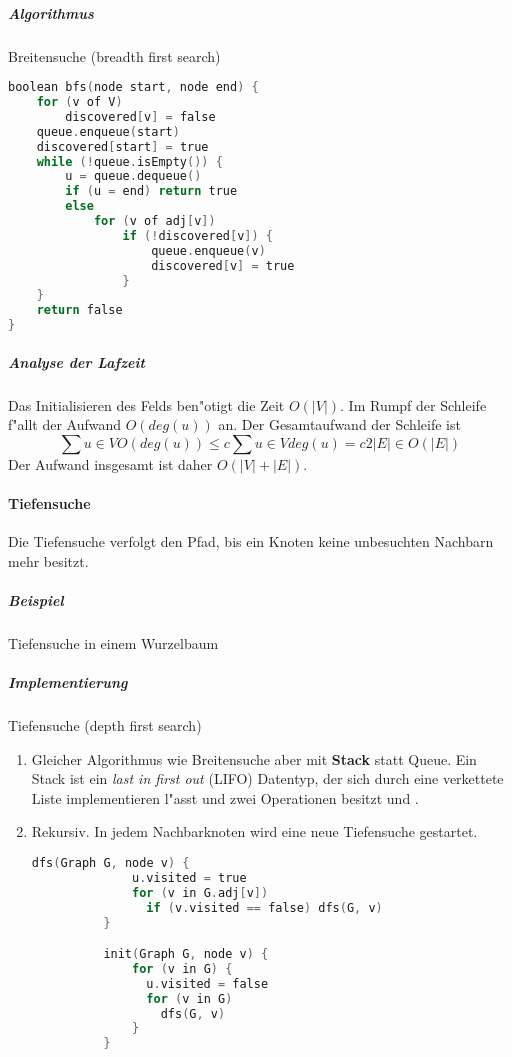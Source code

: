 \subparagraph{Algorithmus} Breitensuche (breadth first search)
\begin{lstlisting}[language=C]
boolean bfs(node start, node end) {
    for (v of V)
        discovered[v] = false
    queue.enqueue(start)
    discovered[start] = true
    while (!queue.isEmpty()) {
        u = queue.dequeue()
        if (u = end) return true
        else
            for (v of adj[v])
                if (!discovered[v]) {
                    queue.enqueue(v)
                    discovered[v] = true
                }
    }
    return false
}
\end{lstlisting}

\subparagraph{Analyse der Lafzeit} \parskp
Das Initialisieren des Felds  ben"otigt die Zeit $O(|V|)$. Im Rumpf der  Schleife
f"allt der Aufwand $O(deg(u))$ an. Der Gesamtaufwand der  Schleife ist
\[
    \sum{u\in V}O(deg(u))\le c\sum{u\in V}deg(u)=c2|E|\in O(|E|)
\]
Der Aufwand insgesamt ist daher $O(|V|+|E|)$.

\paragraph{Tiefensuche} \parskp
Die Tiefensuche verfolgt den Pfad, bis ein Knoten keine unbesuchten Nachbarn mehr besitzt.

\subparagraph{Beispiel} Tiefensuche in einem Wurzelbaum\\

\subparagraph{Implementierung} Tiefensuche (depth first search)
\begin{enumerate}
    \item Gleicher Algorithmus wie Breitensuche aber mit \textbf{Stack} statt Queue. Ein Stack ist ein
          \textit{last in first out} (LIFO) Datentyp, der sich durch eine verkettete Liste implementieren
          l"asst und zwei Operationen besitzt  und .
    \item Rekursiv. In jedem Nachbarknoten wird eine neue Tiefensuche gestartet.
          \begin{lstlisting}[language=C]
          dfs(Graph G, node v) {
              u.visited = true
              for (v in G.adj[v])
                if (v.visited == false) dfs(G, v)
          }

          init(Graph G, node v) {
              for (v in G) {
                u.visited = false
                for (v in G)
                  dfs(G, v)
              }  
          }
          \end{lstlisting}
\end{enumerate}

